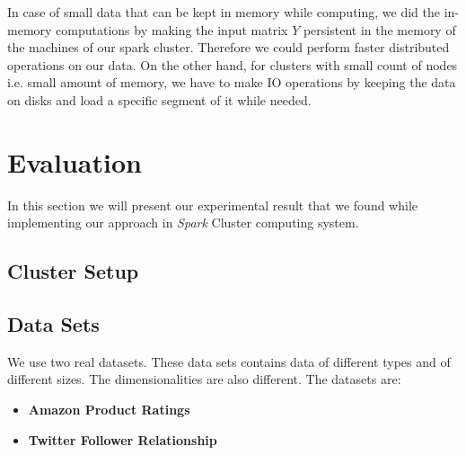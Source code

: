 \documentclass[10pt,conference,letterpaper]{IEEEtran}
\begin{document}
In case of small data that can be kept in memory while computing, we did the in-memory computations by making the input matrix $Y$ persistent in the memory of the machines of our spark cluster. Therefore we could perform faster distributed operations on our data. On the other hand, for clusters with small count of nodes i.e. small amount of memory, we have to make IO operations by keeping the data on disks and load a specific segment of it while needed. 



\section{Evaluation}
In this section we will present our experimental result that we found while implementing our approach in \textit{Spark} Cluster computing system.
\subsection{Cluster Setup}

\subsection{Data Sets}
We use two real datasets. These data sets contains data of different types and of different sizes. The dimensionalities are also different. The datasets are:

\begin{itemize}
\item \textbf{Amazon Product Ratings}\hspace*{\fill} \\
\item \textbf{Twitter Follower Relationship}\hspace*{\fill} \\
\end{itemize}



%
%
\end{document}
